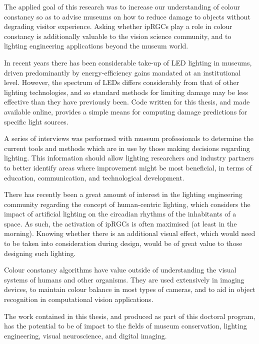 \begin{impactstatement}

The applied goal of this research was to increase our understanding of colour constancy so as to advise museums on how to reduce damage to objects without degrading visitor experience. Asking whether ipRGCs play a role in colour constancy is additionally valuable to the vision science community, and to lighting engineering applications beyond the museum world.

In recent years there has been considerable take-up of LED lighting in museums, driven predominantly by energy-efficiency gains mandated at an institutional level. However, the spectrum of LEDs differs considerably from that of other lighting technologies, and so standard methods for limiting damage may be less effective than they have previously been. Code written for this thesis, and made available online, provides a simple means for computing damage predictions for specific light sources. 

A series of interviews was performed with museum professionals to determine the current tools and methods which are in use by those making decisions regarding lighting. This information should allow lighting researchers and industry partners to better identify areas where improvement might be most beneficial, in terms of education, communication, and technological development.

There has recently been a great amount of interest in the lighting engineering community regarding the concept of human-centric lighting, which considers the impact of artificial lighting on the circadian rhythms of the inhabitants of a space. As such, the activation of ipRGCs is often maximised (at least in the morning). Knowing whether there is an additional visual effect, which would need to be taken into consideration during design, would be of great value to those designing such lighting.

Colour constancy algorithms have value outside of understanding the visual systems of humans and other organisms. They are used extensively in imaging devices, to maintain colour balance in most types of cameras, and to aid in object recognition in computational vision applications.

The work contained in this thesis, and produced as part of this doctoral program, has the potential to be of impact to the fields of museum conservation, lighting engineering, visual neuroscience, and digital imaging.  




\end{impactstatement}
